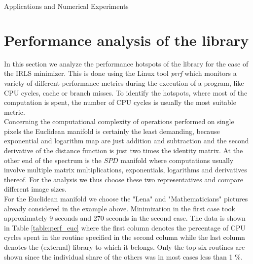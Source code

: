 \begin{chapter}{Applications and Numerical Experiments}
\FloatBarrier
\section{Performance analysis of the library} %
\label{sec:Performance analysis of the library}
In this section we analyze the performance hotspots of the library for the case of the IRLS minimizer. This is done using the Linux tool \emph{perf} which monitors a variety of different
performance metrics during the execution of a program, like CPU cycles, cache or branch misses. To identify the hotspots, where most of the computation is spent, the number of CPU cycles is
usually the most suitable metric.\\

Concerning the computational complexity of operations performed on single pixels the Euclidean manifold is certainly the least demanding, because exponential and logarithm map are just 
addition and subtraction and the second derivative of the distance function is just two times the identity matrix. At the other end of the spectrum is the $SPD$ manifold where
computations usually involve multiple matrix multiplications, exponentials, logarithms and derivatives thereof. For the analysis we thus choose these two representatives and compare
different image sizes.\\

For the Euclidean manifold we choose the "Lena" and "Mathematicians" pictures already considered in the example above. Minimization in the first case took approximately 9 seconds and 270 seconds in
the second case. The data is shown in Table \ref{table:perf_euc} where the first column denotes the percentage of CPU cycles spent in the routine specified in the second column 
while the last column denotes the (external) library to which it belongs. Only the top six routines are shown since the individual share of the others was in most cases less than 1 \%. \\


\end{chapter}
